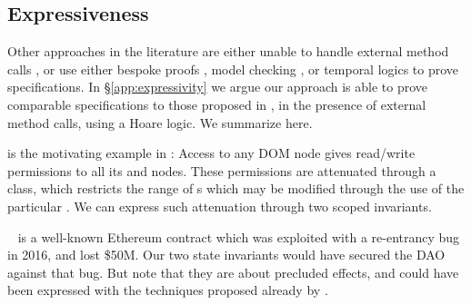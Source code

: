 \newcommand{\paragraphSDD}[1]{\vspace{.01cm}{\textit{#1}}}

\subsection{Expressiveness} 

Other approaches in the literature are either unable to handle external method calls \cite{OOPSLA22}, or use either bespoke proofs \cite{dd}, model checking \cite{VerX}, or temporal logics to prove specifications.
In \S \ref{app:expressivity} we argue our approach is able to prove comparable specifications to those proposed in  \cite{OOPSLA22,dd,VerX}, in the presence of external method calls,
using a Hoare logic.
We   summarize here.

 

\paragraphSDD{DOM} is the motivating example  in \cite{dd}: Access to any DOM node
gives read/write  permissions to  all its  and  nodes. 
These permissions are attenuated   through a  class, %
 which restricts the range of s which may be modified through the use of the particular . 
We can express such  attenuation   through two scoped invariants.

\paragraphSDD{DAO} %
 ~\cite{Dao}  is a well-known Ethereum contract   which was exploited with a re-entrancy bug in 2016, 
and lost \$50M. 
Our two state invariants  would have secured the DAO against that bug. %
But note  that they are about precluded effects, and 
 could have been expressed with the techniques proposed already by \cite{MeyerDBC92}.
 

